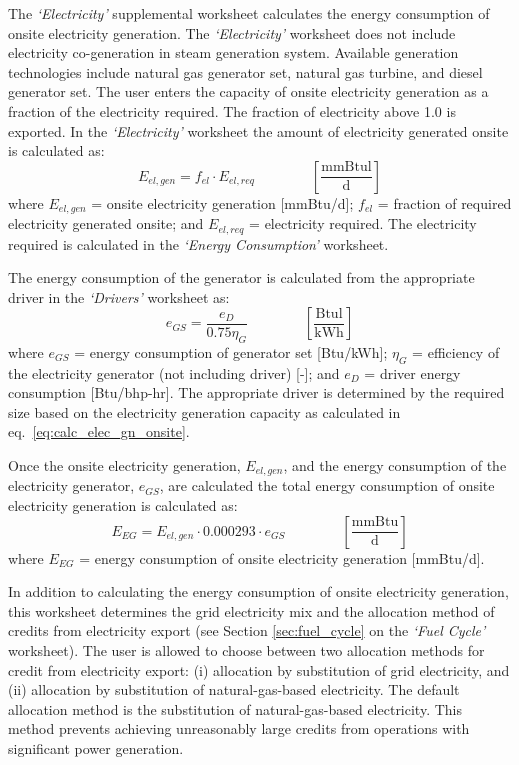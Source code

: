 \documentclass[11pt]{report}
\newcommand{\sheet}[1]{\textit{`{#1}'}}
\newcommand{\eqnunitfrac}[2]{\quad\quad \scriptstyle{\left[\frac{\text{#1}}{\text{#2}}\right]}}
\begin{document}
The \sheet{Electricity} supplemental worksheet calculates the energy consumption of onsite electricity generation. The \sheet{Electricity} worksheet does not include electricity co-generation in steam generation system. Available generation technologies include natural gas generator set, natural gas turbine, and diesel generator set. The user enters the capacity of onsite electricity generation as a fraction of the electricity required. The fraction of electricity above 1.0 is exported. In the \sheet{Electricity} worksheet the amount of electricity generated onsite is calculated as:
\begin{equation} \label{eq:calc_elec_gn_onsite}
E_{el,gen} = f_{el} \cdot E_{el,req}  \quad\quad\eqnunitfrac{mmBtul}{d}
\end{equation}
where $E_{el,gen}$ = onsite electricity generation [mmBtu/d]; $f_{el}$ = fraction of required electricity generated onsite; and $E_{el,req}$ = electricity required. The electricity required is calculated in the \sheet{Energy Consumption} worksheet.

The energy consumption of the generator is calculated from the appropriate driver in the \sheet{Drivers} worksheet as:
\begin{equation}
e_{GS} = \frac{e_{D}}{0.75 \eta_{G} } \quad\quad\eqnunitfrac{Btul}{kWh}
\end{equation}
where $e_{GS}$ = energy consumption of generator set [Btu/kWh]; $\eta_{G}$ = efficiency of the electricity generator (not including driver) [-]; and $e_{D}$ = driver energy consumption [Btu/bhp-hr]. The appropriate driver is determined by the required size based on the electricity generation capacity as calculated in eq.\ \eqref{eq:calc_elec_gn_onsite}.


Once the onsite electricity generation, $E_{el,gen}$, and the energy consumption of the electricity generator, $e_{GS}$, are calculated the total energy consumption of onsite electricity generation is calculated as:
\begin{equation}
E_{EG} = E_{el,gen} \cdot 0.000293 \cdot e_{GS} \quad\quad\eqnunitfrac{mmBtu}{d}
\end{equation}
where $E_{EG}$ = energy consumption of onsite electricity generation [mmBtu/d].

In addition to calculating the energy consumption of onsite electricity generation, this worksheet determines the grid electricity mix and the allocation method of credits from electricity export (see Section \ref{sec:fuel_cycle} on the \sheet{Fuel Cycle} worksheet). The user is allowed to choose between two allocation methods for credit from electricity export: (i) allocation by substitution of grid electricity, and (ii) allocation by substitution of natural-gas-based electricity. The default allocation method is the substitution of natural-gas-based electricity. This method prevents achieving unreasonably large credits from operations with significant power generation. 
\end{document}
